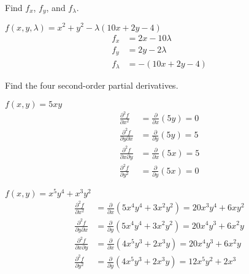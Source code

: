 \documentclass[12pt]{article}
\newenvironment{problem}[2][]{
    \begin{trivlist}
        \item[
            {\bfseries #1}
            {\bfseries #2.}
        ]
}{\end{trivlist}}
\begin{document}
\clearpage

\noindent Find $f_x$, $f_y$, and $f_\lambda$.

\begin{problem}{25}
    $f(x,y,\lambda) = x^2 + y^2 - \lambda(10x + 2y - 4)$
    \begin{align}
        f_x &= 2x - 10\lambda \\
        f_y &= 2y - 2\lambda \\
        f_\lambda &= - \left(10x + 2y - 4\right)
    \end{align}
\end{problem}

\bigskip

\noindent Find the four second-order partial derivatives.

\begin{problem}{27}
    $f(x,y) = 5xy$
    \begin{align}
        \frac{\partial^2 f}{\partial x^2} &= \frac{\partial}{\partial x} \left(5y\right) = 0 \\
        \frac{\partial^2 f}{\partial y \partial x} &= \frac{\partial}{\partial y} \left(5y\right) = 5 \\
        \frac{\partial^2 f}{\partial x \partial y} &= \frac{\partial}{\partial x} \left(5x\right) = 5 \\
        \frac{\partial^2 f}{\partial y^2} &= \frac{\partial}{\partial y} \left(5x\right) = 0
    \end{align}
\end{problem}

\begin{problem}{31}
    $f(x,y) = x^5y^4 + x^3y^2$
    \begin{align}
        \frac{\partial^2 f}{\partial x^2} &= \frac{\partial}{\partial x} \left(5x^4 y^4 + 3x^2 y^2\right) = 20x^3 y^4 + 6x y^2 \\
        \frac{\partial^2 f}{\partial y \partial x} &= \frac{\partial}{\partial y} \left(5x^4 y^4 + 3x^2 y^2\right) = 20x^4 y^3 + 6x^2 y \\
        \frac{\partial^2 f}{\partial x \partial y} &= \frac{\partial}{\partial x} \left(4x^5 y^3 + 2x^3 y\right) = 20x^4 y^3 + 6x^2 y \\
        \frac{\partial^2 f}{\partial y^2} &= \frac{\partial}{\partial y} \left(4x^5 y^3 + 2x^3 y\right) = 12x^5 y^2 + 2x^3
    \end{align}
\end{problem}

\bigskip
\end{document}
